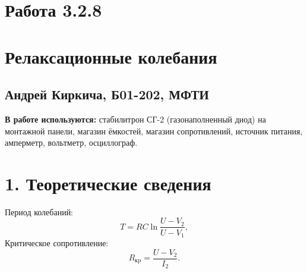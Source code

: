 \documentclass[14pt,a4paper]{article}
\begin{document}
\section*{Работа 3.2.8}	
	\section*{Релаксационные колебания}
	\subsection*{Андрей Киркича, Б01-202, МФТИ}

\textbf{В работе используются:} стабилитрон СГ-2 (газонаполненный диод) на монтажной панели, магазин ёмкостей, магазин сопротивлений, источник питания, амперметр, вольтметр, осциллограф.

\section*{1. Теоретические сведения}
\begin{figure}[H]
\centering
{}
\qquad \qquad
{}
\end{figure}

Период колебаний:
\begin{equation}
    T=R C \ln \frac{U-V_{2}}{U-V_{1}},
\end{equation}
Критическое сопротивление:
\begin{equation}
R_{\mathrm{кp}}=\frac{U-V_{2}}{I_{2}}.
\end{equation}
\end{document}
